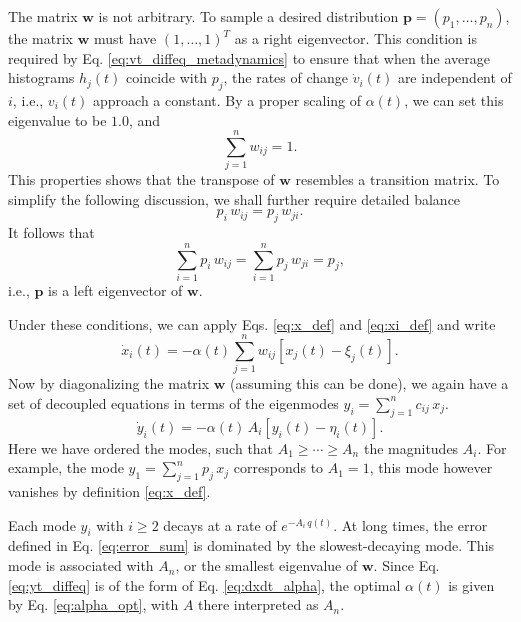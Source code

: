 \documentclass[reprint]{revtex4-1}
\begin{document}
The matrix $\mathbf w$ is not arbitrary.
%
To sample a desired distribution $\mathbf p = (p_1, \dots, p_n)$,
the matrix $\mathbf w$ must have $(1, \dots, 1)^T$
as a right eigenvector.
%
This condition is required by
Eq. \eqref{eq:vt_diffeq_metadynamics}
to ensure that
when the average histograms $h_j(t)$
coincide with $p_j$,
the rates of change $\dot v_i(t)$
are independent of $i$,
i.e., $v_i(t)$ approach a constant.
%
By a proper scaling of $\alpha(t)$,
we can set this eigenvalue to be $1.0$, and
\begin{equation}
  \sum_{j = 1}^n w_{ij} = 1.
  \label{eq:w_sumj}
\end{equation}
%
This properties shows that the transpose
of $\mathbf w$ resembles a transition matrix.
%
To simplify the following discussion,
we shall further require detailed balance
%
\begin{equation}
  p_i \, w_{ij} = p_j \, w_{ji}.
  \label{eq:w_detailedbalance}
\end{equation}
%
It follows that
\begin{equation}
  \sum_{i = 1}^n p_i \, w_{ij}
  =
  \sum_{i = 1}^n p_j \, w_{ji}
  = p_j,
  \label{eq:w_balance}
\end{equation}
i.e., $\mathbf p$ is a left eigenvector of $\mathbf w$.




Under these conditions,
we can apply Eqs. \eqref{eq:x_def} and \eqref{eq:xi_def}
and write
$$
\dot x_i(t)
=
-\alpha(t) \sum_{j = 1}^n
w_{ij} \left[ x_j(t) - \xi_j (t) \right].
$$
Now by diagonalizing the matrix $\mathbf w$
(assuming this can be done), we again have
a set of decoupled equations
in terms of the eigenmodes $y_i = \sum_{j=1}^n c_{ij} \, x_j$.
%
\begin{equation}
\dot y_i(t)
=
-\alpha(t) \, A_i \left[ y_i(t) - \eta_i (t) \right].
\label{eq:yt_diffeq}
\end{equation}
%
Here we have ordered the modes, such that $A_1 \ge \cdots \ge A_n$
the magnitudes $A_i$.
%
For example, the mode $y_1 = \sum_{j=1}^n p_j \, x_j$
corresponds to $A_1 = 1$,
this mode however vanishes by definition
\eqref{eq:x_def}.


Each mode $y_i$ with $i \ge 2$ decays at a rate of $e^{-A_i \, q(t)}$.
%
At long times, the error defined in Eq. \eqref{eq:error_sum}
is dominated by the slowest-decaying mode.
%
This mode is associated with $A_n$,
or the smallest eigenvalue of $\mathbf w$.
%
Since Eq. \eqref{eq:yt_diffeq}
is of the form of Eq. \eqref{eq:dxdt_alpha},
%
the optimal $\alpha(t)$
is given by Eq. \eqref{eq:alpha_opt},
with $A$ there interpreted as $A_n$.


\end{document}
